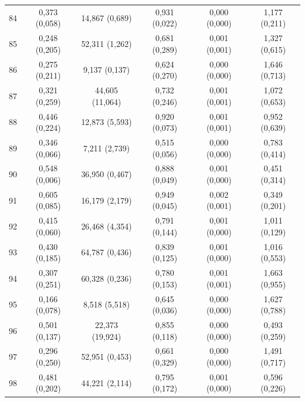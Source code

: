 \begin{tabular}{l c c c c c}
84 & 0,373 (0,058) & 14,867 (0,689) & 0,931 (0,022) & 0,000 (0,000) & 1,177 (0,211) \\
85 & 0,248 (0,205) & 52,311 (1,262) & 0,681 (0,289) & 0,001 (0,001) & 1,327 (0,615) \\
86 & 0,275 (0,211) & 9,137 (0,137) & 0,624 (0,270) & 0,000 (0,000) & 1,646 (0,713) \\
87 & 0,321 (0,259) & 44,605 (11,064) & 0,732 (0,246) & 0,001 (0,001) & 1,072 (0,653) \\
88 & 0,446 (0,224) & 12,873 (5,593) & 0,920 (0,073) & 0,001 (0,001) & 0,952 (0,639) \\
89 & 0,346 (0,066) & 7,211 (2,739) & 0,515 (0,056) & 0,000 (0,000) & 0,783 (0,414) \\
90 & 0,548 (0,006) & 36,950 (0,467) & 0,888 (0,049) & 0,001 (0,000) & 0,451 (0,314) \\
91 & 0,605 (0,085) & 16,179 (2,179) & 0,949 (0,045) & 0,002 (0,001) & 0,349 (0,201) \\
92 & 0,415 (0,060) & 26,468 (4,354) & 0,791 (0,144) & 0,001 (0,000) & 1,011 (0,129) \\
93 & 0,430 (0,185) & 64,787 (0,436) & 0,839 (0,125) & 0,001 (0,000) & 1,016 (0,553) \\
94 & 0,307 (0,251) & 60,328 (0,236) & 0,780 (0,153) & 0,001 (0,001) & 1,663 (0,955) \\
95 & 0,166 (0,078) & 8,518 (5,518) & 0,645 (0,036) & 0,000 (0,000) & 1,627 (0,788) \\
96 & 0,501 (0,137) & 22,373 (19,924) & 0,855 (0,118) & 0,000 (0,000) & 0,493 (0,259) \\
97 & 0,296 (0,250) & 52,951 (0,453) & 0,661 (0,329) & 0,000 (0,000) & 1,491 (0,717) \\
98 & 0,481 (0,202) & 44,221 (2,114) & 0,795 (0,172) & 0,001 (0,000) & 0,596 (0,226) \\
\hline 
 \end{tabular}
